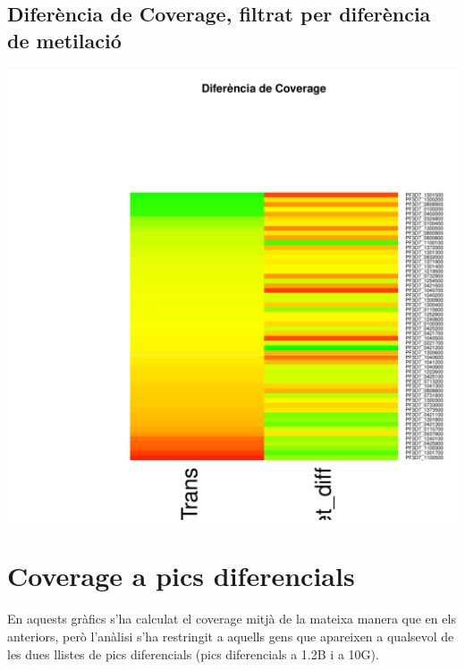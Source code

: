 \documentclass{article}\usepackage[]{graphicx}\usepackage[]{color}
\newenvironment{knitrout}{}{} %
\begin{document}
\subsection{Diferència de Coverage, filtrat per diferència de metilació}
\begin{knitrout}
\color{fgcolor}

{\centering \includegraphics[width=.9\linewidth]{figure/minimal-heat_cov_diff_filter-1} 

}



\end{knitrout}


\clearpage
\section{Coverage a pics diferencials}
En aquests gràfics s'ha calculat el coverage mitjà de la mateixa manera que en els anteriors, però l'anàlisi s'ha restringit a aquells gens que apareixen a qualsevol de les dues llistes de pics diferencials (pics diferencials a 1.2B i a 10G). 
\end{document}

